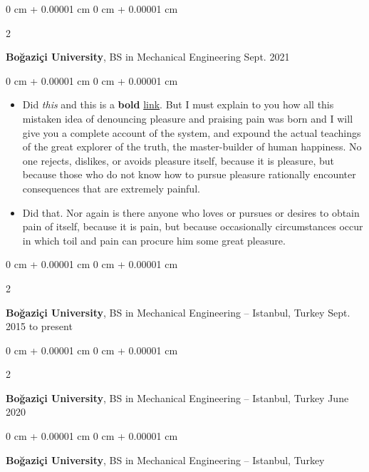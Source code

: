 \documentclass[10pt, letterpaper]{article}
\newenvironment{highlights}{
    \begin{itemize}[
        topsep=0.10 cm,
        parsep=0.10 cm,
        partopsep=0pt,
        itemsep=0pt,
        leftmargin=0 cm + 10pt
    ]
}{
    \end{itemize}
} %
\newenvironment{onecolentry}{
    \begin{adjustwidth}{
        0 cm + 0.00001 cm
    }{
        0 cm + 0.00001 cm
    }
}{
    \end{adjustwidth}
} %
\newenvironment{twocolentry}[2][]{
    \onecolentry
    \def\secondColumn{#2}
    \setcolumnwidth{\fill, 4.5 cm}
    \begin{paracol}{2}
}{
    \switchcolumn \raggedleft \secondColumn
    \end{paracol}
    \endonecolentry
} %
\begin{document}
        \begin{twocolentry}{
            Sept. 2021
        }
            \textbf{Boğaziçi University}, BS in Mechanical Engineering\end{twocolentry}

        \vspace{0.10 cm}
        \begin{onecolentry}
            \begin{highlights}
                \item Did \textit{this} and this is a \textbf{bold} \href{https://example.com}{link}. But I must explain to you how all this mistaken idea of denouncing pleasure and praising pain was born and I will give you a complete account of the system, and expound the actual teachings of the great explorer of the truth, the master-builder of human happiness. No one rejects, dislikes, or avoids pleasure itself, because it is pleasure, but because those who do not know how to pursue pleasure rationally encounter consequences that are extremely painful.
                \item Did that. Nor again is there anyone who loves or pursues or desires to obtain pain of itself, because it is pain, but because occasionally circumstances occur in which toil and pain can procure him some great pleasure.
            \end{highlights}
        \end{onecolentry}


        \vspace{0.2 cm}

        \begin{twocolentry}{
            Sept. 2015 to present
        }
            \textbf{Boğaziçi University}, BS in Mechanical Engineering -- Istanbul, Turkey\end{twocolentry}



        \vspace{0.2 cm}

        \begin{twocolentry}{
            June 2020
        }
            \textbf{Boğaziçi University}, BS in Mechanical Engineering -- Istanbul, Turkey\end{twocolentry}



        \vspace{0.2 cm}

        \begin{onecolentry}
            \textbf{Boğaziçi University}, BS in Mechanical Engineering -- Istanbul, Turkey\end{onecolentry}
\end{document}
